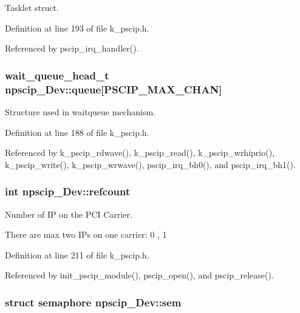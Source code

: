 Tasklet struct. 



Definition at line 193 of file k\_\-pscip.h.

Referenced by pscip\_\-irq\_\-handler().\hypertarget{structnpscip___dev_88140323c9d4ac1e49fe6a36fbed02aa}{
\subsubsection[{queue}]{\setlength{\rightskip}{0pt plus 5cm}wait\_\-queue\_\-head\_\-t {\bf npscip\_\-Dev::queue}\mbox{[}PSCIP\_\-MAX\_\-CHAN\mbox{]}}}
\label{structnpscip___dev_88140323c9d4ac1e49fe6a36fbed02aa}


Structure used in waitqueue mechanism. 



Definition at line 188 of file k\_\-pscip.h.

Referenced by k\_\-pscip\_\-rdwave(), k\_\-pscip\_\-read(), k\_\-pscip\_\-wrhiprio(), k\_\-pscip\_\-write(), k\_\-pscip\_\-wrwave(), pscip\_\-irq\_\-bh0(), and pscip\_\-irq\_\-bh1().\hypertarget{structnpscip___dev_94183aef5d449f3f07669641aed0b6dd}{
\subsubsection[{refcount}]{\setlength{\rightskip}{0pt plus 5cm}int {\bf npscip\_\-Dev::refcount}}}
\label{structnpscip___dev_94183aef5d449f3f07669641aed0b6dd}


Number of IP on the PCI Carrier. 

There are max two IPs on one carrier: 0 , 1 

Definition at line 211 of file k\_\-pscip.h.

Referenced by init\_\-pscip\_\-module(), pscip\_\-open(), and pscip\_\-release().\hypertarget{structnpscip___dev_b25b0d08851ec85f28cdd6938072e903}{
\subsubsection[{sem}]{\setlength{\rightskip}{0pt plus 5cm}struct semaphore {\bf npscip\_\-Dev::sem}}}
\label{structnpscip___dev_b25b0d08851ec85f28cdd6938072e903}


